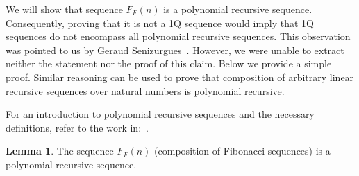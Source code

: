\documentclass[en]{pracamgr}
\theoremstyle{definition}
\newtheorem{lemma}[theorem]{Lemma}
\begin{document}
We will show that sequence $F_F (n)$ is a polynomial recursive sequence. Consequently, proving that it is not a 1Q sequence would imply that 1Q sequences do not encompass all polynomial recursive sequences.
This observation was pointed to us by Geraud Senizurgues~\cite{Zerg}. However, we were unable to extract neither the statement nor the proof of this claim. Below we provide a simple proof. Similar reasoning can be used to prove that composition of arbitrary linear recursive sequences over natural numbers is polynomial recursive.

For an introduction to polynomial recursive sequences and the necessary definitions, refer to the work in:~\cite{CadilhacMPPS20}. 

\begin{lemma}
    The sequence $F_F(n)$ (composition of Fibonacci sequences) is a polynomial recursive sequence.
\end{lemma}
\end{document}
